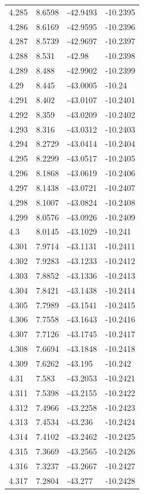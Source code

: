 \begin{tabular}{llll}
4.285 & 8.6598 & -42.9493 & -10.2395 \\
4.286 & 8.6169 & -42.9595 & -10.2396 \\
4.287 & 8.5739 & -42.9697 & -10.2397 \\
4.288 & 8.531 & -42.98 & -10.2398 \\
4.289 & 8.488 & -42.9902 & -10.2399 \\
4.29 & 8.445 & -43.0005 & -10.24 \\
4.291 & 8.402 & -43.0107 & -10.2401 \\
4.292 & 8.359 & -43.0209 & -10.2402 \\
4.293 & 8.316 & -43.0312 & -10.2403 \\
4.294 & 8.2729 & -43.0414 & -10.2404 \\
4.295 & 8.2299 & -43.0517 & -10.2405 \\
4.296 & 8.1868 & -43.0619 & -10.2406 \\
4.297 & 8.1438 & -43.0721 & -10.2407 \\
4.298 & 8.1007 & -43.0824 & -10.2408 \\
4.299 & 8.0576 & -43.0926 & -10.2409 \\
4.3 & 8.0145 & -43.1029 & -10.241 \\
4.301 & 7.9714 & -43.1131 & -10.2411 \\
4.302 & 7.9283 & -43.1233 & -10.2412 \\
4.303 & 7.8852 & -43.1336 & -10.2413 \\
4.304 & 7.8421 & -43.1438 & -10.2414 \\
4.305 & 7.7989 & -43.1541 & -10.2415 \\
4.306 & 7.7558 & -43.1643 & -10.2416 \\
4.307 & 7.7126 & -43.1745 & -10.2417 \\
4.308 & 7.6694 & -43.1848 & -10.2418 \\
4.309 & 7.6262 & -43.195 & -10.242 \\
4.31 & 7.583 & -43.2053 & -10.2421 \\
4.311 & 7.5398 & -43.2155 & -10.2422 \\
4.312 & 7.4966 & -43.2258 & -10.2423 \\
4.313 & 7.4534 & -43.236 & -10.2424 \\
4.314 & 7.4102 & -43.2462 & -10.2425 \\
4.315 & 7.3669 & -43.2565 & -10.2426 \\
4.316 & 7.3237 & -43.2667 & -10.2427 \\
4.317 & 7.2804 & -43.277 & -10.2428 \\

\end{tabular}
